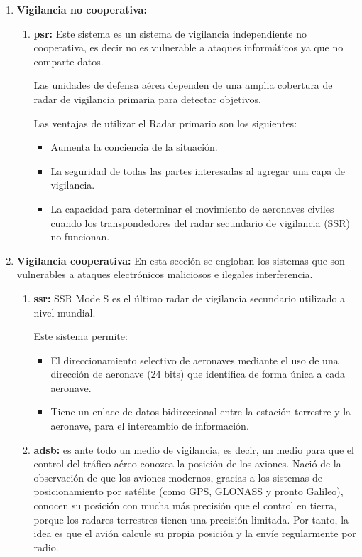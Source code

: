 \begin{enumerate}
    \item \textbf{Vigilancia no cooperativa:}
    \begin{enumerate}
        \item \textbf{\acrfull{psr}:} Este sistema es un sistema de vigilancia independiente no cooperativa, es decir no es vulnerable a ataques informáticos ya que no comparte datos. 
        
        Las unidades de defensa aérea dependen de una amplia cobertura de radar de vigilancia primaria para detectar objetivos. 
        
        Las ventajas de utilizar el Radar primario son los siguientes:
        
        \begin{itemize}
            \item Aumenta la conciencia de la situación.
            \item La seguridad de todas las partes interesadas al agregar una capa de vigilancia.
            \item La capacidad para determinar el movimiento de aeronaves civiles cuando los transpondedores del radar secundario de vigilancia (SSR) no funcionan.
        \end{itemize}
    \end{enumerate}
    
    \item \textbf{Vigilancia cooperativa:} En esta sección se engloban los sistemas que son vulnerables a ataques electrónicos maliciosos e ilegales interferencia.
    \begin{enumerate}
        \item \textbf{\acrfull{ssr}:} SSR Mode S es el último radar de vigilancia secundario utilizado a nivel mundial. 
        
        Este sistema permite:
        
        \begin{itemize}
            \item El direccionamiento selectivo de aeronaves mediante el uso de una dirección de aeronave (24 bits) que identifica de forma única a cada aeronave.
            \item Tiene un enlace de datos bidireccional entre la estación terrestre y la aeronave, para el intercambio de información.
        \end{itemize}


        \item \textbf{\acrfull{adsb}:} es ante todo un medio de vigilancia, es decir, un medio para que el control del tráfico aéreo conozca la posición de los aviones. Nació de la observación de que los aviones modernos, gracias a los sistemas de posicionamiento por satélite (como GPS, GLONASS y pronto Galileo), conocen su posición con mucha más precisión que el control en tierra, porque los radares terrestres tienen una precisión limitada. Por tanto, la idea es que el avión calcule su propia posición y la envíe regularmente por radio.
        

\end{enumerate}
\end{enumerate}
